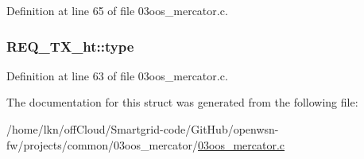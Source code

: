 Definition at line 65 of file 03oos\+\_\+mercator.\+c.

\subsubsection[{\texorpdfstring{type}{type}}]{ R\+E\+Q\+\_\+\+T\+X\+\_\+ht\+::type}\hypertarget{struct_r_e_q___t_x__ht_ac11d6ac1b582ca7e7b6dcacbb19af288}{}\label{struct_r_e_q___t_x__ht_ac11d6ac1b582ca7e7b6dcacbb19af288}


Definition at line 63 of file 03oos\+\_\+mercator.\+c.



The documentation for this struct was generated from the following file\+:\begin{DoxyCompactItemize}
\item 
/home/lkn/off\+Cloud/\+Smartgrid-\/code/\+Git\+Hub/openwsn-\/fw/projects/common/03oos\+\_\+mercator/\hyperlink{03oos__mercator_8c}{03oos\+\_\+mercator.\+c}\end{DoxyCompactItemize}

